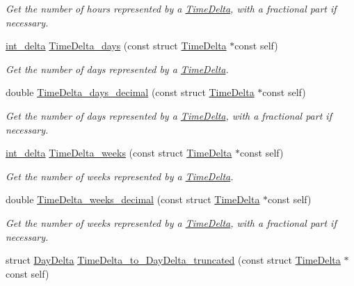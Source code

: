 \begin{DoxyCompactItemize}
\begin{DoxyCompactList}\small\item\em \-Get the number of hours represented by a \hyperlink{structTimeDelta}{\-Time\-Delta}, with a fractional part if necessary. \end{DoxyCompactList}\item 
\hyperlink{types_8h_a8a67cf99971c5cfeeaa2380ba84a4c92}{int\-\_\-delta} \hyperlink{time-delta_8h_ae7e2ca9c2f8ce05faf4ba2a207d0e8dd}{\-Time\-Delta\-\_\-days} (const struct \hyperlink{structTimeDelta}{\-Time\-Delta} $\ast$const self)
\begin{DoxyCompactList}\small\item\em \-Get the number of days represented by a \hyperlink{structTimeDelta}{\-Time\-Delta}. \end{DoxyCompactList}\item 
double \hyperlink{time-delta_8h_a5b79dc42f8fca1ea501e016a24440464}{\-Time\-Delta\-\_\-days\-\_\-decimal} (const struct \hyperlink{structTimeDelta}{\-Time\-Delta} $\ast$const self)
\begin{DoxyCompactList}\small\item\em \-Get the number of days represented by a \hyperlink{structTimeDelta}{\-Time\-Delta}, with a fractional part if necessary. \end{DoxyCompactList}\item 
\hyperlink{types_8h_a8a67cf99971c5cfeeaa2380ba84a4c92}{int\-\_\-delta} \hyperlink{time-delta_8h_a162a7cec10d82c6cf922a32eb22f58d1}{\-Time\-Delta\-\_\-weeks} (const struct \hyperlink{structTimeDelta}{\-Time\-Delta} $\ast$const self)
\begin{DoxyCompactList}\small\item\em \-Get the number of weeks represented by a \hyperlink{structTimeDelta}{\-Time\-Delta}. \end{DoxyCompactList}\item 
double \hyperlink{time-delta_8h_a1cf0e7d811b1fd0dd4c50c26d110f30a}{\-Time\-Delta\-\_\-weeks\-\_\-decimal} (const struct \hyperlink{structTimeDelta}{\-Time\-Delta} $\ast$const self)
\begin{DoxyCompactList}\small\item\em \-Get the number of weeks represented by a \hyperlink{structTimeDelta}{\-Time\-Delta}, with a fractional part if necessary. \end{DoxyCompactList}\item 
struct \hyperlink{structDayDelta}{\-Day\-Delta} \hyperlink{time-delta_8h_abd089246702cb29504de0fe4e3057ad2}{\-Time\-Delta\-\_\-to\-\_\-\-Day\-Delta\-\_\-truncated} (const struct \hyperlink{structTimeDelta}{\-Time\-Delta} $\ast$const self)

\end{DoxyCompactItemize}
